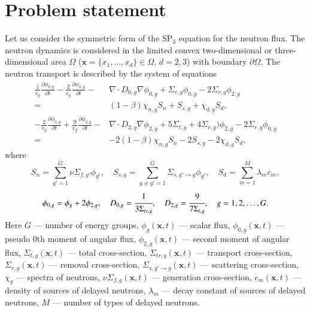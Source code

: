 \documentclass[authoryear]{elsarticle}
\begin{document}
\section{Problem statement}
Let us consider the symmetric form of the SP$_3$ equation for the neutron flux.
The neutron dynamics is considered in the limited convex two-dimensional or three-dimensional area $\Omega$ ($\bm x = \{x_1, ..., x_d\} \in \Omega, \, d = 2,3$) with boundary $\partial \Omega$.
The neutron transport is described by the system of equations
\begin{equation}\label{1}
\begin{split}
	\frac{1}{v_g} \frac{\partial \phi_{0,g}}{\partial t} - 
	\frac{2}{v_g} \frac{\partial \phi_{2,g}}{\partial t} - 
	& \nabla \cdot D_{0,g} \nabla \phi_{0,g} + 
	  \Sigma_{r,g} \phi_{0,g} -  
	2 \Sigma_{r,g} \phi_{2,g} \\ 
	= & (1 - \beta) \chi_{n,g} S_{n} + S_{s,g} + \chi_{d,g} S_d, \\
	- \frac{2}{v_g} \frac{\partial \phi_{0,g}}{\partial t} + 
	  \frac{9}{v_g} \frac{\partial \phi_{2,g}}{\partial t} - 
	& \nabla \cdot D_{2,g} \nabla \phi_{2,g} + 
	5 \Sigma_{t,g} + 4\Sigma_{r,g}) \phi_{2,g} - 
	2 \Sigma_{r,g} \phi_{0,g} \\
	= & - 2(1 - \beta) \chi_{n,g} S_{n} - 2 S_{s,g} - 2 \chi_{d,g} S_d,
\end{split}
\end{equation}
where
\[
	S_{n} = \sum_{g'=1}^{G} \nu \Sigma_{f,g'} \phi_{g'}, \quad
	S_{s,g} = \sum_{g\neq g'=1}^{G} \Sigma_{s,g' \rightarrow g} \phi_{g'}, \quad
	S_{d} = \sum_{m=1}^{M} \lambda_m c_m,
\]
\[
	\phi_{0,g} = \phi_g + 2\phi_{2,g}, \quad
	D_{0,g} = \cfrac{1}{3 \Sigma_{tr,g}}, \quad
	D_{2,g} = \cfrac{9}{7 \Sigma_{t,g}}, \quad 
	g = 1,2,\dots,G.
\]
Here $G$ --- number of energy groups,
$\phi_g(\bm x, t)$ --- scalar flux,
$\phi_{0,g}(\bm x, t)$ --- pseudo 0th moment of angular flux,
$\phi_{2,g}(\bm x, t)$ --- second moment of angular flux,
$\Sigma_{t,g}(\bm x, t)$ --- total cross-section,
$\Sigma_{tr,g}(\bm x, t)$ --- transport cross-section, 
$\Sigma_{r,g}(\bm x, t)$ --- removal cross-section,
$\Sigma_{s,g' \rightarrow g}(\bm x, t)$ --- scattering cross-section,
$\chi_g$  --- spectra of neutrons,
$\nu \Sigma_{f,g}(\bm x, t)$ --- generation cross-section,
$c_m(\bm x, t)$ --- density of sources of delayed neutrons,
$\lambda_m$ --- decay constant of sources of delayed neutrons,
$M$ --- number of types of delayed neutrons.
\end{document}
